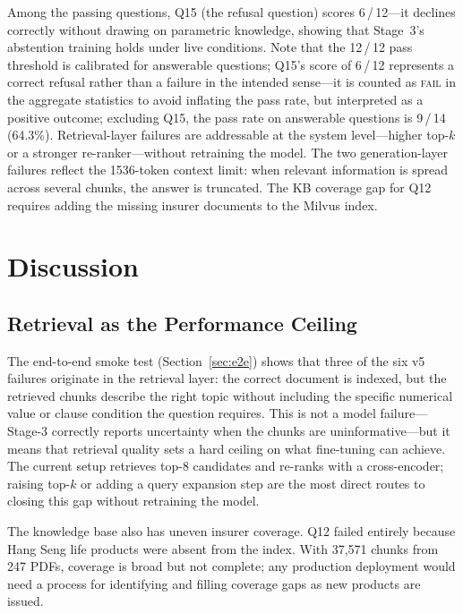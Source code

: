 Among the passing questions, Q15 (the refusal question) scores 6\,/\,12---it
declines correctly without drawing on parametric knowledge, showing that
Stage~3's abstention training holds under live conditions.
Note that the 12\,/\,12 pass threshold is calibrated for answerable questions;
Q15's score of 6\,/\,12 represents a correct refusal rather than a failure in
the intended sense---it is counted as \textsc{fail} in the aggregate statistics
to avoid inflating the pass rate, but interpreted as a positive outcome;
excluding Q15, the pass rate on answerable questions is 9\,/\,14 (64.3\%).
Retrieval-layer failures are addressable at the system level---higher top-$k$
or a stronger re-ranker---without retraining the model.
The two generation-layer failures reflect the 1536-token context limit: when
relevant information is spread across several chunks, the answer is truncated.
The KB coverage gap for Q12 requires adding the missing insurer documents to
the Milvus index.


\section{Discussion}
\label{sec:discussion}

\subsection{Retrieval as the Performance Ceiling}

The end-to-end smoke test (Section~\ref{sec:e2e}) shows that three of the six
v5 failures originate in the retrieval layer: the correct document is indexed,
but the retrieved chunks describe the right topic without including the specific
numerical value or clause condition the question requires.
This is not a model failure---Stage-3 correctly reports uncertainty when the
chunks are uninformative---but it means that retrieval quality sets a hard
ceiling on what fine-tuning can achieve.
The current setup retrieves top-8 candidates and re-ranks with a cross-encoder;
raising top-$k$ or adding a query expansion step are the most direct routes to
closing this gap without retraining the model.

The knowledge base also has uneven insurer coverage.
Q12 failed entirely because Hang Seng life products were absent from the index.
With 37,571 chunks from 247 PDFs, coverage is broad but not complete;
any production deployment would need a process for identifying and filling
coverage gaps as new products are issued.

